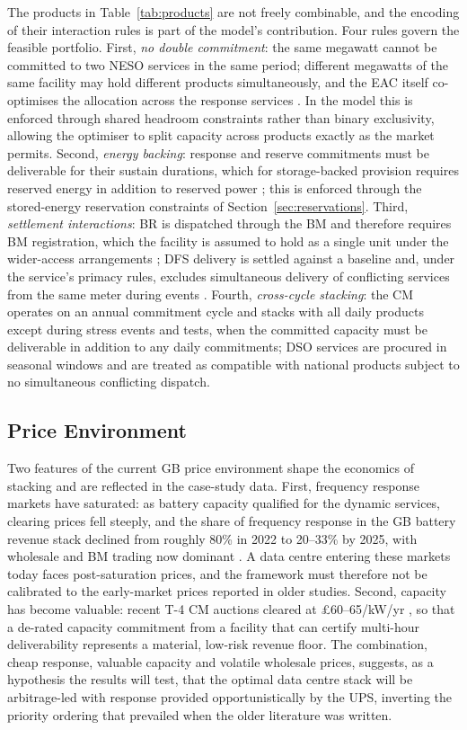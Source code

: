 \documentclass[lettersize,journal]{IEEEtran}
\begin{document}
The products in Table~\ref{tab:products} are not freely combinable, and the encoding of their interaction rules is part of the model's contribution. Four rules govern the feasible portfolio. First, \emph{no double commitment}: the same megawatt cannot be committed to two NESO services in the same period; different megawatts of the same facility may hold different products simultaneously, and the EAC itself co-optimises the allocation across the response services \cite{neso2026eac,modo2023eac}. In the model this is enforced through shared headroom constraints rather than binary exclusivity, allowing the optimiser to split capacity across products exactly as the market permits. Second, \emph{energy backing}: response and reserve commitments must be deliverable for their sustain durations, which for storage-backed provision requires reserved energy in addition to reserved power \cite{ngeso2021dcterms}; this is enforced through the stored-energy reservation constraints of Section~\ref{sec:reservations}. Third, \emph{settlement interactions}: BR is dispatched through the BM and therefore requires BM registration, which the facility is assumed to hold as a single unit under the wider-access arrangements \cite{elexon2024p415}; DFS delivery is settled against a baseline and, under the service's primacy rules, excludes simultaneous delivery of conflicting services from the same meter during events \cite{neso2026dfs}. Fourth, \emph{cross-cycle stacking}: the CM operates on an annual commitment cycle and stacks with all daily products except during stress events and tests, when the committed capacity must be deliverable in addition to any daily commitments; DSO services are procured in seasonal windows and are treated as compatible with national products subject to no simultaneous conflicting dispatch.

\subsection{Price Environment}

Two features of the current GB price environment shape the economics of stacking and are reflected in the case-study data. First, frequency response markets have saturated: as battery capacity qualified for the dynamic services, clearing prices fell steeply, and the share of frequency response in the GB battery revenue stack declined from roughly 80\% in 2022 to 20--33\% by 2025, with wholesale and BM trading now dominant \cite{modo2026benchmark,modo2025november}. A data centre entering these markets today faces post-saturation prices, and the framework must therefore not be calibrated to the early-market prices reported in older studies. Second, capacity has become valuable: recent T-4 CM auctions cleared at \pounds60--65/kW/yr \cite{drax2026cm,desnz2026cmparams}, so that a de-rated capacity commitment from a facility that can certify multi-hour deliverability represents a material, low-risk revenue floor. The combination, cheap response, valuable capacity and volatile wholesale prices, suggests, as a hypothesis the results will test, that the optimal data centre stack will be arbitrage-led with response provided opportunistically by the UPS, inverting the priority ordering that prevailed when the older literature was written.
\end{document}
